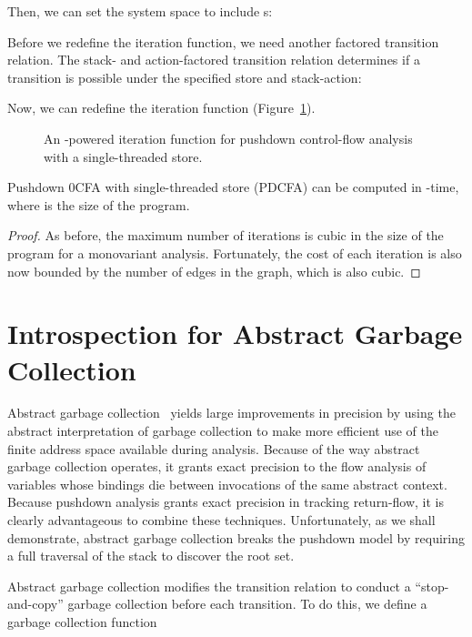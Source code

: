 Then, we can set the system space to include \ecg s:


Before we redefine the iteration function, we need another factored
transition relation.
The stack- and action-factored transition relation
 determines if a transition is possible
under the specified store and stack-action:




Now, we can redefine the iteration function (Figure~\ref{fig:widen-trans}).

\begin{figure}
\figrule


\caption{An \ecg{}-powered iteration function for pushdown control-flow analysis with a single-threaded store.}
\label{fig:widen-trans}
\figrule
\end{figure}

\begin{theorem}
Pushdown 0CFA with single-threaded store (PDCFA) can be computed in -time, where  is the
size of the program.
\end{theorem}
\begin{proof}
As before, the maximum number of iterations is cubic in the size of
the program for a monovariant analysis.
Fortunately, the cost of each iteration is also now bounded by the number
of edges in the graph, which is also cubic.
\end{proof}







\section{Introspection for Abstract Garbage Collection}
Abstract garbage collection~\cite{mattmight:Might:2006:GammaCFA} yields large
improvements in precision by using the abstract interpretation of garbage
collection to make more efficient use of the finite address space available
during analysis.
Because of the way abstract garbage collection operates, it grants exact
precision to the flow analysis of variables whose bindings die
between invocations of the same abstract context.
Because pushdown analysis grants exact precision in tracking return-flow, it is
clearly advantageous to combine these techniques.
Unfortunately, as we shall demonstrate, abstract garbage collection
breaks the pushdown model by requiring a full traversal of the stack to discover the
root set.


Abstract garbage collection modifies the transition relation
to conduct a ``stop-and-copy'' garbage collection before each
transition.
To do this, we define a garbage collection function 

